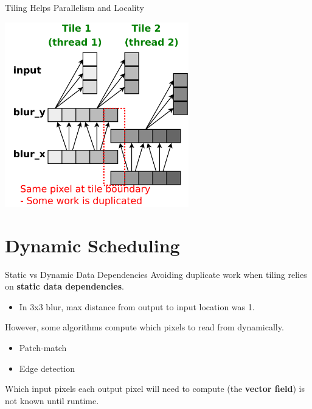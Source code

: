 \documentclass[xcolor=dvipsnames]{beamer}
\begin{document}
\begin{frame}{Tiling Helps Parallelism and Locality}
	\begin{center}
	\includegraphics[width=0.6\textwidth]{blur-tile2.pdf}
	\end{center}
\end{frame}




\section{Dynamic Scheduling}


\begin{frame}{Static vs Dynamic Data Dependencies}
	Avoiding duplicate work when tiling relies on {\bf static data dependencies}.
	\begin{itemize}
		\item In 3x3 blur, max distance from output to input location was 1.
	\end{itemize}
	\linegap

	However, some algorithms compute which pixels to read from dynamically.
	\begin{itemize}
		\item Patch-match
		\item Edge detection
	\end{itemize}
	\linegap

	Which input pixels each output pixel will need to compute (the {\bf vector field}) is not known until runtime.
\end{frame}
\end{document}
